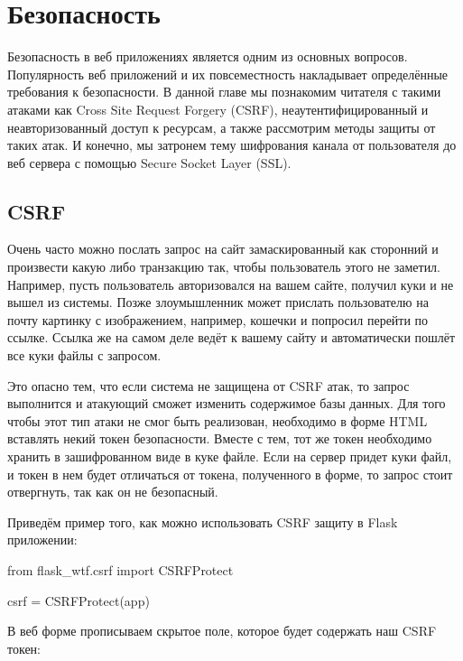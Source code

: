 

\section{Безопасность}

Безопасность в веб приложениях является одним из основных
вопросов. Популярность веб приложений и их повсеместность 
накладывает определённые требования к безопасности. В данной
главе мы познакомим читателя с такими атаками как Cross
Site Request Forgery (CSRF), неаутентифицированный и неавторизованный
доступ к ресурсам, а также рассмотрим методы защиты от таких атак. 
И конечно, мы затронем тему шифрования канала от пользователя до веб 
сервера с помощью Secure Socket Layer (SSL).

\subsection{CSRF}

Очень часто можно послать запрос на сайт замаскированный как
сторонний и произвести какую либо транзакцию так, чтобы пользователь
этого не заметил. Например, пусть пользователь авторизовался на вашем
сайте, получил куки и не вышел из системы. Позже злоумышленник может
прислать пользователю на почту картинку с изображением, например, кошечки
и попросил перейти по ссылке. Ссылка же на самом деле ведёт к вашему
сайту и автоматически пошлёт все куки файлы с запросом. 

Это опасно тем, что если система не защищена от CSRF атак, то 
запрос выполнится и атакующий сможет изменить содержимое базы 
данных. Для того чтобы этот тип атаки не смог быть реализован,
необходимо в форме HTML вставлять некий токен безопасности. Вместе
с тем, тот же токен необходимо хранить в зашифрованном виде в куке 
файле. Если на сервер придет куки файл, и токен в нем будет отличаться
от токена, полученного в форме, то запрос стоит отвергнуть, так как 
он не безопасный.

Приведём пример того, как можно использовать CSRF защиту в Flask 
приложении:

\begin{python}
from flask_wtf.csrf import CSRFProtect

csrf = CSRFProtect(app)
\end{python}

В веб форме прописываем скрытое поле, которое будет содержать наш CSRF токен:

